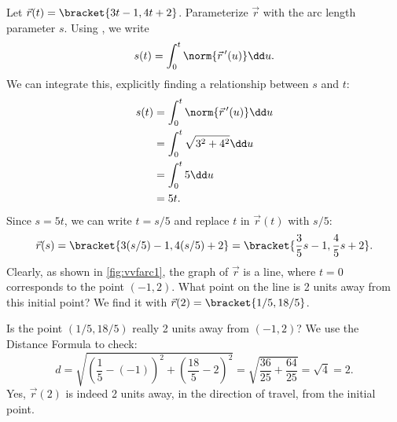 \begin{example}\label{ex_vvfarc1}
Let $\vec r(t) =\bracket{3t-1,4t+2}$. Parameterize $\vec r$ with the arc length parameter $s$.
\solution
Using , we write
\[s(t) = \int_0^t \norm{\vec r\,'(u)}\dd u.\]
We can integrate this, explicitly finding a relationship between $s$ and $t$:
\begin{align*}
s(t) &= \int_0^t \norm{\vec r\,'(u)}\dd u \\
			&= \int_0^t \sqrt{3^2+4^2}\dd u\\
			&= \int_0^t 5\dd u\\
			&= 5t.
\end{align*}
Since $s=5t$, we can write $t=s/5$ and replace $t$ in $\vec r(t)$ with $s/5$:
\[\vec r(s) =\bracket{3(s/5)-1, 4(s/5)+2}=\bracket{\frac35s-1,\frac45s+2}.\]
Clearly, as shown in \autoref{fig:vvfarc1}, the graph of $\vec r$ is a line, where $t=0$ corresponds to the point $(-1,2)$. What point on the line is 2 units away from this initial point? We find it with $\vec r(2) =\bracket{1/5, 18/5}$. 


Is the point $(1/5,18/5)$ really 2 units away from $(-1,2)$? We use the Distance Formula to check:
\[
d = \sqrt{\left(\frac15-(-1)\right)^2+ \left(\frac{18}5-2\right)^2} = \sqrt{\frac{36}{25}+\frac{64}{25}} = \sqrt{4}=2.
\]
Yes, $\vec r(2)$ is indeed 2 units away, in the direction of travel, from the initial point.
\end{example}

